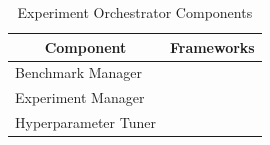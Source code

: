 \begin{table}[t]
\centering
\caption{Experiment Orchestrator Components}
\vspace{-0.75em}
\label{tab:ra-experiment-orchestrator}
\renewcommand{\arraystretch}{0.9}
{\scriptsize
\begin{tabular}{@{}p{2.6cm}p{5.9cm}@{}}
\toprule
\multicolumn{1}{c}{\textbf{Component}} & \multicolumn{1}{c}{\textbf{Frameworks}} \\ \midrule
Benchmark Manager & \cite{bettini2024benchmarl}\\

Experiment Manager & \cite{juliani2020} \cite{stable-baselines3} \cite{rl-zoo3} \cite{liang2018rllib} \cite{hoffman2020acme} \cite{hu2022marllib} \cite{bettini2024benchmarl} \cite{dekock2023mava} \cite{castro18dopamine} \cite{tianshou}\\

Hyperparameter Tuner & \cite{rl-zoo3} \cite{liang2018rllib} \cite{hu2022marllib}\\

\bottomrule
\end{tabular}}
\vspace{-1em}
\end{table}